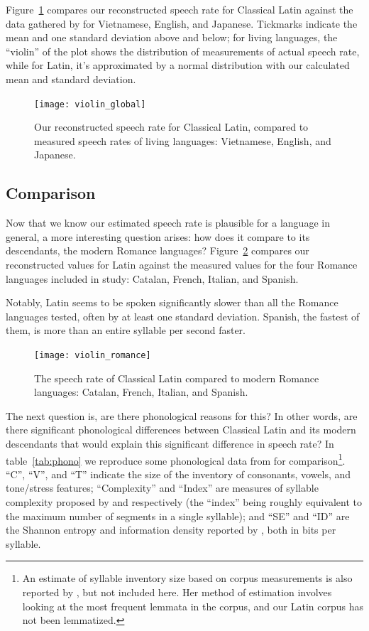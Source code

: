 \documentclass[12pt,twoside]{article}
\begin{document}
Figure~\ref{fig:violin1} compares our reconstructed speech rate for Classical Latin against the data gathered by \citet{coupé} for Vietnamese, English, and Japanese. Tickmarks indicate the mean and one standard deviation above and below; for living languages, the ``violin'' of the plot shows the distribution of measurements of actual speech rate, while for Latin, it's approximated by a normal distribution with our calculated mean and standard deviation.

\begin{figure}[p]
\centering
\caption{Our reconstructed speech rate for Classical Latin, compared to measured speech rates of living languages: Vietnamese, English, and Japanese.}
\label{fig:violin1}
\noindent\texttt{[image: violin\_global]}
\end{figure}

\subsection{Comparison}

Now that we know our estimated speech rate is plausible for a language in general, a more interesting question arises: how does it compare to its descendants, the modern Romance languages? Figure~\ref{fig:violin2} compares our reconstructed values for Latin against the measured values for the four Romance languages included in  study: Catalan, French, Italian, and Spanish.

Notably, Latin seems to be spoken significantly slower than all the Romance languages tested, often by at least one standard deviation. Spanish, the fastest of them, is more than an entire syllable per second faster.

\begin{figure}[p]
\centering
\caption{The speech rate of Classical Latin compared to modern Romance languages: Catalan, French, Italian, and Spanish.}
\label{fig:violin2}
\noindent\texttt{[image: violin\_romance]}
\end{figure}

The next question is, are there phonological reasons for this? In other words, are there significant phonological differences between Classical Latin and its modern descendants that would explain this significant difference in speech rate? In table~\ref{tab:phono} we reproduce some phonological data from \citet{oh} for comparison\footnote{An estimate of syllable inventory size based on corpus measurements is also reported by \citet{oh}, but not included here. Her method of estimation involves looking at the most frequent lemmata in the corpus, and our Latin corpus has not been lemmatized.}. ``C'', ``V'', and ``T'' indicate the size of the inventory of consonants, vowels, and tone/stress features; ``Complexity'' and ``Index'' are measures of syllable complexity proposed by \citet{wals} and \citet{lapsyd} respectively (the ``index'' being roughly equivalent to the maximum number of segments in a single syllable); and ``SE'' and ``ID'' are the Shannon entropy and information density reported by \citet{oh}, both in bits per syllable.
\end{document}
